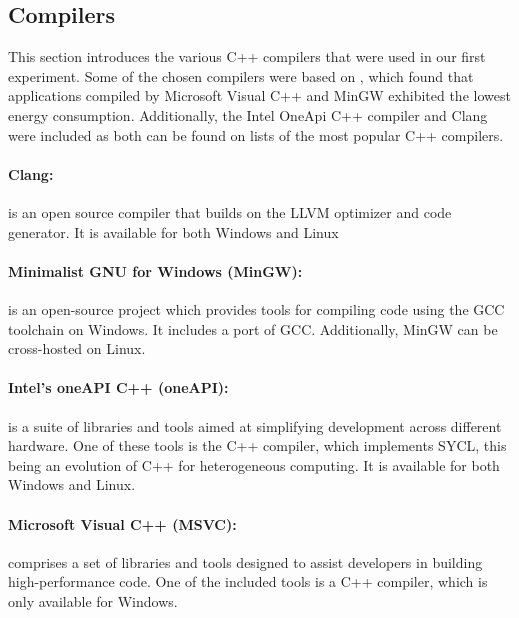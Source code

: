 \subsection{Compilers}

This section introduces the various C++ compilers that were used in our first experiment. Some of the chosen compilers were based on \cite{hassan2017}, which found that applications compiled by Microsoft Visual C++ and MinGW exhibited the lowest energy consumption. Additionally, the Intel OneApi C++ compiler and Clang were included as both can be found on lists of the most popular C++ compilers\cite{mycplus, educba, softwaretestinghelp}. 



\paragraph{Clang:} is an open source compiler that builds on the LLVM optimizer and code generator. It is available for both Windows and Linux\cite{clang}

\paragraph*{Minimalist GNU for Windows (MinGW):} is an open-source project which provides tools for compiling code using the GCC toolchain on Windows. It includes a port of GCC. Additionally, MinGW can be cross-hosted on Linux.\cite{mingw}


\paragraph*{Intel's oneAPI C++ (oneAPI):} is a suite of libraries and tools aimed at simplifying development across different hardware. One of these tools is the C++ compiler, which implements SYCL, this being an evolution of C++ for heterogeneous computing. It is available for both Windows and Linux.\cite{oneapi}

\paragraph*{Microsoft Visual C++ (MSVC):}  comprises a set of libraries and tools designed to assist developers in building high-performance code. One of the included tools is a C++ compiler, which is only available for Windows\cite{msvc}.